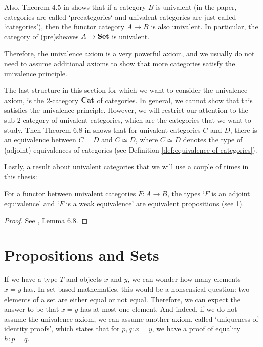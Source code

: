 Also, Theorem 4.5 in \autocite{univalent-categories} shows that if a category $ B $ is univalent (in the paper, categories are called `precategories` and univalent categories are just called `categories'), then the functor category $ A \rightarrow B $ is also univalent. In particular, the category of (pre)sheaves $ A \to \mathbf{Set} $ is univalent.

Therefore, the univalence axiom is a very powerful axiom, and we usually do not need to assume additional axioms to show that more categories satisfy the univalence principle.

The last structure in this section for which we want to consider the univalence axiom, is the 2-category $ \mathbf{Cat} $ of categories. In general, we cannot show that this satisfies the univalence principle. However, we will restrict our attention to the sub-2-category of univalent categories, which are the categories that we want to study. Then Theorem 6.8 in \autocite{univalent-categories} shows that for univalent categories $ C $ and $ D $, there is an equivalence between $ C = D $ and $ C \simeq D $, where $ C \simeq D $ denotes the type of (adjoint) equivalences of categories (see Definition \ref{def:equivalence-of-categories}).

Lastly, a result about univalent categories that we will use a couple of times in this thesis:
\begin{lemma}\label{lem:univalen-category-equivalence}
  For a functor between univalent categories $ F: A \to B $, the types `$ F $ is an adjoint equivalence' and `$ F $ is a weak equivalence' are equivalent propositions (see \ref{sec:homotopy-props-sets}).
\end{lemma}
\begin{proof}
  See \autocite{univalent-categories}, Lemma 6.8.
\end{proof}

\section{Propositions and Sets}\label{sec:homotopy-props-sets}
If we have a type $ T $ and objects $ x $ and $ y $, we can wonder how many elements $ x = y $ has. In set-based mathematics, this would be a nonsensical question: two elements of a set are either equal or not equal. Therefore, we can expect the answer to be that $ x = y $ has at most one element. And indeed, if we do not assume the univalence axiom, we can assume another axiom, called `uniqueness of identity proofs', which states that for $ p, q: x = y $, we have a proof of equality $ h: p = q $.

